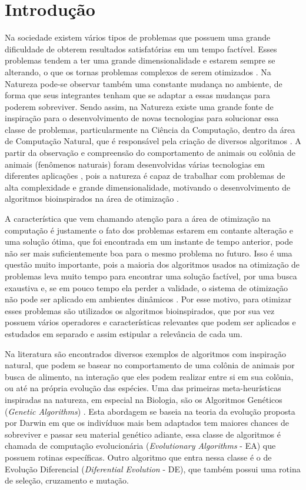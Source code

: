 \chapter{Introdução}
\label{ch:intro}

Na sociedade existem vários tipos de problemas que possuem uma grande dificuldade de obterem resultados satisfatórias em um tempo factível. Esses problemas tendem a ter uma grande dimensionalidade e estarem sempre se alterando, o que os tornas problemas complexos de serem otimizados \cite{de2004otimizaccao}. Na Natureza pode-se observar também uma constante mudança no ambiente, de forma que seus integrantes tenham que se adaptar a essas mudanças para poderem sobreviver. Sendo assim, na Natureza existe uma grande fonte de inspiração para o desenvolvimento de novas tecnologias para solucionar essa classe de problemas, particularmente na Ciência da Computação, dentro da área de Computação Natural, que é responsável pela criação de diversos algoritmos \cite{de2007fundamentals}. A partir da observação e compreensão do comportamento de animais ou colônia de animais (fenômenos naturais) foram desenvolvidas várias tecnologias em diferentes aplicações \cite{rozenberg2011handbook}, pois a natureza é capaz de trabalhar com problemas de alta complexidade e grande dimensionalidade, motivando o desenvolvimento de algoritmos bioinspirados na área de otimização \cite{andre2015multiple}.

A característica que vem chamando atenção para a área de otimização na computação é justamente o fato dos problemas estarem em contante alteração e uma solução ótima, que foi encontrada em um instante de tempo anterior, pode não ser mais suficientemente boa para o mesmo problema no futuro. Isso é uma questão muito importante, pois a maioria dos algoritmos usados na otimização de problemas leva muito tempo para encontrar uma solução factível, por uma busca exaustiva e, se em pouco tempo ela perder a validade, o sistema de otimização não pode ser aplicado em ambientes dinâmicos \cite{morrison2003performance}. Por esse motivo, para otimizar esses problemas são utilizados os algoritmos bioinspirados, que por sua vez possuem vários operadores e características relevantes que podem ser aplicados e estudados em separado e assim estipular a relevância de cada um.

Na literatura são encontrados diversos exemplos de algoritmos com inspiração natural, que podem se basear no comportamento de uma colônia de animais por busca de alimento, na interação que eles podem realizar entre si em sua colônia, ou até na própria evolução das espécies. Uma das primeiras meta-heurísticas inspiradas na natureza, em especial na Biologia, são os Algoritmos Genéticos (\textit{Genetic Algorithms}) \cite{holland1975adaptation}. Esta abordagem se baseia na teoria da evolução proposta por Darwin em que os indivíduos mais bem adaptados tem maiores chances de sobreviver e passar seu material genético adiante, essa classe de algoritmos é chamada de computação evolucionária (\textit{Evolutionary Algorithms} - EA) que possuem rotinas específicas. Outro algoritmo que entra nessa classe é o de Evolução Diferencial (\textit{Diferential Evolution} - DE), que também possui uma rotina de seleção, cruzamento e mutação. 

